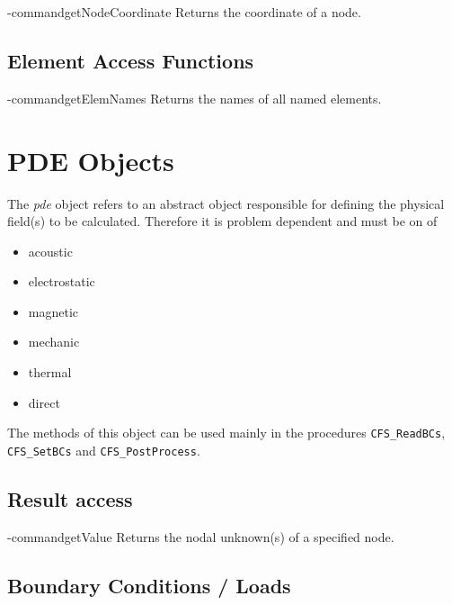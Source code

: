 \tcl-command{getNodeCoordinate}
Returns the coordinate of a node.
\begin{tcl-params}
  \paramlist
  \returnlist
\end{tcl-params}


\subsection{Element Access Functions}

\tcl-command{getElemNames}
Returns the names of all named elements.
\begin{tcl-params}
  \returnlist
\end{tcl-params}



 
\section{PDE Objects}
The {\em pde} object refers to an abstract object responsible for
defining the physical field(s) to be calculated. Therefore it is
problem dependent and must be on of
\begin{itemize}
\item acoustic
\item electrostatic
\item magnetic
\item mechanic
\item thermal
\item direct
\end{itemize}
The methods of this object can be used mainly in the procedures
\verb#CFS_ReadBCs#, \verb#CFS_SetBCs# and \verb#CFS_PostProcess#.

\subsection{Result access}

\tcl-command{getValue}
Returns the nodal unknown(s) of a specified node.
\begin{tcl-params}
  \paramlist
  \returnlist
\end{tcl-params}

\subsection{Boundary Conditions / Loads}

